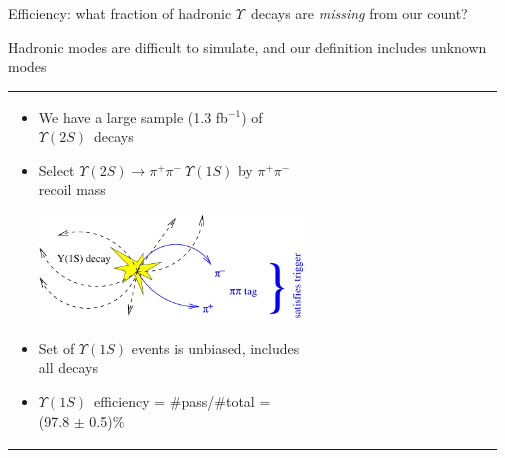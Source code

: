 \documentclass[landscape]{article}
\newcommand{\inv}{$^{-1}$}
\newcommand{\ups}{$\Upsilon$}
\newcommand{\us}{$\Upsilon(1S)$}
\newcommand{\uss}{$\Upsilon(2S)$}
\begin{document}
\begin{slide:efficiency}

Efficiency: what fraction of hadronic \ups\ decays are {\it missing} from our count?

\vfill
Hadronic modes are difficult to simulate, and our definition includes unknown modes

\vfill
\begin{tabular}{p{0.62\linewidth} c p{0.35\linewidth}}
  \begin{minipage}{\linewidth}
    \begin{itemize}\setlength{\itemsep}{0.75 cm}

      \item We have a large sample (1.3 fb\inv) of \uss\ decays

      \item Select \mbox{$\Upsilon(2S) \to \pi^+ \pi^- \ \Upsilon(1S)$} by $\pi^+ \pi^-$ recoil mass

        \begin{center}
          \includegraphics[width=0.9\linewidth]{plots/twotoone}
        \end{center}

      \item Set of $\Upsilon(1S)$ events is unbiased, includes all decays

      \item \us\ efficiency = \#pass/\#total = (97.8 $\pm$ 0.5)\%


\end{itemize}
\end{minipage}
\end{tabular}
\end{slide:efficiency}
\end{document}
